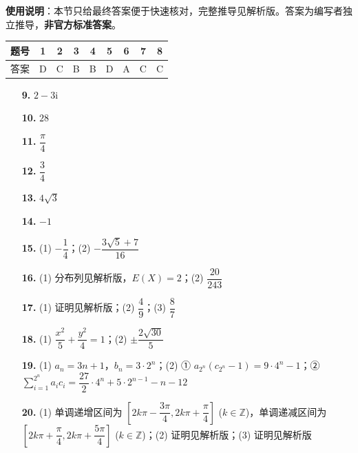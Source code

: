 
\begin{gknotice}
\textbf{使用说明}：本节只给最终答案便于快速核对，完整推导见解析版。答案为编写者独立推导，\textbf{非官方标准答案}。
\end{gknotice}

\begin{center}\begin{tabular}{ccccccccc}
\toprule
题号 & 1 & 2 & 3 & 4 & 5 & 6 & 7 & 8 \\
\midrule
答案 & D & C & B & B & D & A & C & C \\
\bottomrule
\end{tabular}\end{center}

\begin{itemize}[leftmargin=2.6em]
  \item[\textbf{9.}] $2 - 3\mathrm{i}$
  \item[\textbf{10.}] $28$
  \item[\textbf{11.}] $\dfrac{\pi}{4}$
  \item[\textbf{12.}] $\dfrac{3}{4}$
  \item[\textbf{13.}] $4\sqrt{3}$
  \item[\textbf{14.}] $-1$
\end{itemize}

\begin{itemize}[leftmargin=2.6em]
  \item[\textbf{15.}] (1) $-\dfrac{1}{4}$；(2) $-\dfrac{3\sqrt{5} + 7}{16}$
  \item[\textbf{16.}] (1) 分布列见解析版，$E(X) = 2$；(2) $\dfrac{20}{243}$
  \item[\textbf{17.}] (1) 证明见解析版；(2) $\dfrac{4}{9}$；(3) $\dfrac{8}{7}$
  \item[\textbf{18.}] (1) $\dfrac{x^2}{5} + \dfrac{y^2}{4} = 1$；(2) $\pm\dfrac{2\sqrt{30}}{5}$
  \item[\textbf{19.}] (1) $a_n = 3n + 1$，$b_n = 3 \cdot 2^n$；(2) ① $a_{2^n}(c_{2^n} - 1) = 9 \cdot 4^n - 1$；② $\sum_{i=1}^{2^n} a_i c_i = \dfrac{27}{2} \cdot 4^n + 5 \cdot 2^{n-1} - n - 12$
  \item[\textbf{20.}] (1) 单调递增区间为 $\left[2k\pi - \dfrac{3\pi}{4}, 2k\pi + \dfrac{\pi}{4}\right]$ ($k \in \mathbb{Z}$)，单调递减区间为 $\left[2k\pi + \dfrac{\pi}{4}, 2k\pi + \dfrac{5\pi}{4}\right]$ ($k \in \mathbb{Z}$)；(2) 证明见解析版；(3) 证明见解析版
\end{itemize}

